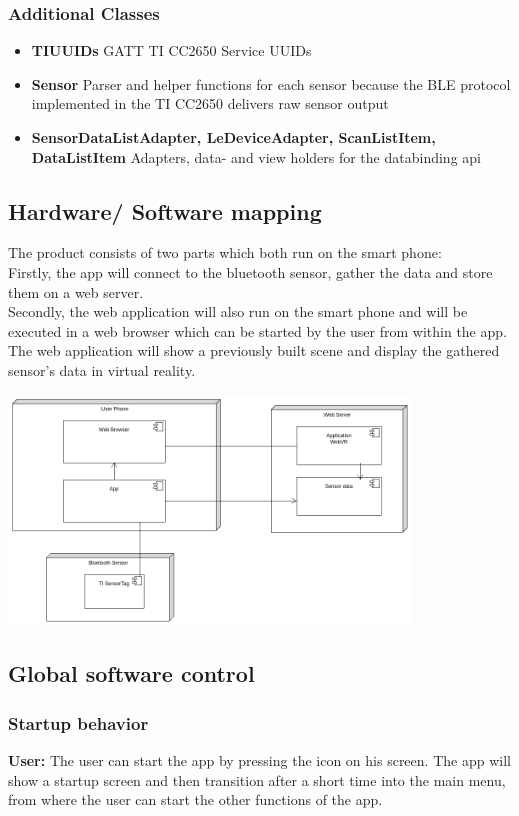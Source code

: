 \subsubsection{Additional Classes}
\begin{itemize}
  \item \textbf{TIUUIDs} GATT TI CC2650 Service UUIDs
  \item \textbf{Sensor} Parser and helper functions for each sensor because the BLE protocol implemented in the TI CC2650 delivers raw sensor output
  \item \textbf{SensorDataListAdapter, LeDeviceAdapter, ScanListItem, DataListItem} Adapters, data- and view holders for the databinding api
\end{itemize}

\subsection{Hardware/ Software mapping}

The product consists of two parts which both run on the smart phone: \\
Firstly, the app will connect to the bluetooth sensor, gather the data and store them on a web server. \\
Secondly, the web application will also run on the smart phone and will be executed in a web browser which can be started by the user from within the app. The web application will show a previously built scene and display the gathered sensor's data in virtual reality.

\includegraphics[width=0.8\textwidth]{diagramms/hsMapping.png}


\subsection{Global software control}
\subsubsection{Startup behavior}
\textbf{User:} The user can start the app by pressing the icon on his screen.
The app will show a startup screen and then transition after a short time into the main menu, from where the user can start the other functions of the app.

